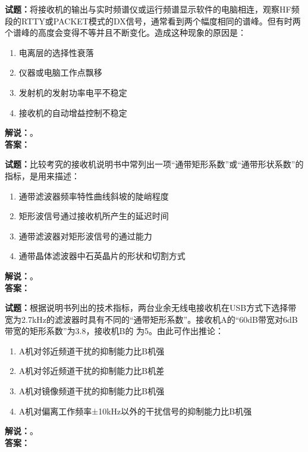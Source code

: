 \documentclass{ctexbook}
\begin{document}
\bigskip




\noindent\textbf{试题：}将接收机的输出与实时频谱仪或运行频谱显示软件的电脑相连，观察HF频段的RTTY或PACKET模式的DX信号，通常看到两个幅度相同的谱峰。但有时两个谱峰的高度会变得不等并且不断变化。造成这种现象的原因是：
\begin{enumerate}[leftmargin=3em]
\item 电离层的选择性衰落
\item 仪器或电脑工作点飘移
\item 发射机的发射功率电平不稳定
\item 接收机的自动增益控制不稳定
\end{enumerate}
\noindent\textbf{解说：}\textbf{}。\\\noindent\textbf{答案：}

\bigskip




\noindent\textbf{试题：}比较考究的接收机说明书中常列出一项“通带矩形系数”或“通带形状系数”的指标，是用来描述：
\begin{enumerate}[leftmargin=3em]
\item 通带滤波器频率特性曲线斜坡的陡峭程度
\item 矩形波信号通过接收机所产生的延迟时间
\item 通带滤波器对矩形波信号的通过能力
\item 通带晶体滤波器中石英晶片的形状和切割方式
\end{enumerate}
\noindent\textbf{解说：}\textbf{}。\\\noindent\textbf{答案：}

\bigskip




\noindent\textbf{试题：}根据说明书列出的技术指标，两台业余无线电接收机在USB方式下选择带宽为2.7\unit{\kHz}的滤波器时具有不同的“通带矩形系数”。接收机A的“60dB带宽对6dB带宽的矩形系数”为3.8，接收机B的 为5。由此可作出推论：
\begin{enumerate}[leftmargin=3em]
\item A机对邻近频道干扰的抑制能力比B机强
\item A机对邻近频道干扰的抑制能力比B机差
\item A机对镜像频道干扰的抑制能力比B机强
\item A机对偏离工作频率±10\unit{\kHz}以外的干扰信号的抑制能力比B机强
\end{enumerate}
\noindent\textbf{解说：}\textbf{}。\\\noindent\textbf{答案：}
\end{document}
